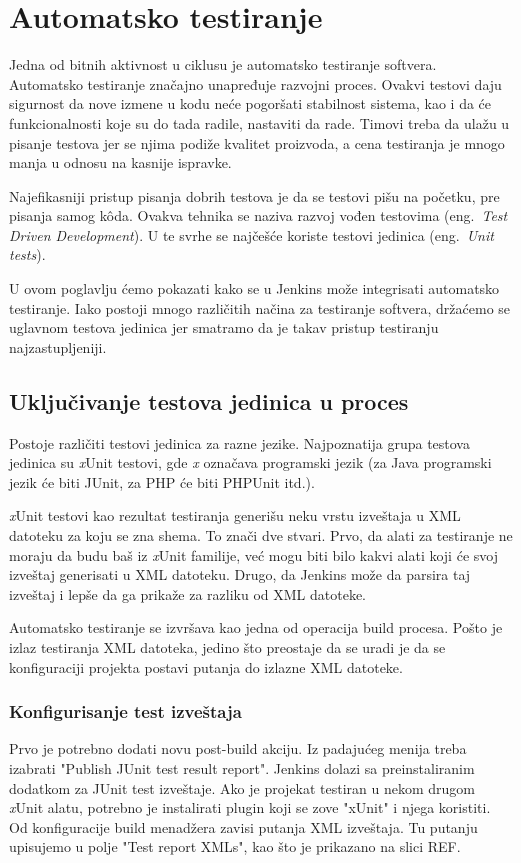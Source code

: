 \section{Automatsko testiranje}
Jedna od bitnih aktivnost u ciklusu je automatsko testiranje softvera. Automatsko testiranje značajno unapređuje razvojni proces. Ovakvi testovi daju sigurnost da nove izmene u kodu neće pogoršati stabilnost sistema, kao i da će funkcionalnosti koje su do tada radile, nastaviti da rade. Timovi treba da ulažu u pisanje testova jer se njima podiže kvalitet proizvoda, a cena testiranja je mnogo manja u odnosu na kasnije ispravke.

Najefikasniji pristup pisanja dobrih testova je da se testovi pišu na početku, pre pisanja samog k\^oda. Ovakva tehnika se naziva razvoj vođen testovima (eng.~{\em Test Driven Development}). U te svrhe se najčešće koriste testovi jedinica (eng.~{\em Unit tests}). 

U ovom poglavlju ćemo pokazati kako se u Jenkins može integrisati automatsko testiranje. Iako postoji mnogo različitih načina za testiranje softvera, držaćemo se uglavnom testova jedinica jer smatramo da je takav pristup testiranju najzastupljeniji.

\subsection{Uključivanje testova jedinica u proces}
Postoje različiti testovi jedinica za razne jezike. Najpoznatija grupa testova jedinica su \textit{x}Unit testovi, gde \textit{x} označava programski jezik (za Java programski jezik će biti JUnit, za PHP će biti PHPUnit itd.). 

\textit{x}Unit testovi kao rezultat testiranja generišu neku vrstu izveštaja u XML datoteku za koju se zna shema. To znači dve stvari. Prvo, da alati za testiranje ne moraju da budu baš iz \textit{x}Unit familije, već mogu biti bilo kakvi alati koji će svoj izveštaj generisati u XML datoteku. Drugo, da Jenkins može da parsira taj izveštaj i lepše da ga prikaže za razliku od XML datoteke.

Automatsko testiranje se izvršava kao jedna od operacija build procesa. Pošto je izlaz testiranja XML datoteka, jedino što preostaje da se uradi je da se konfiguraciji projekta postavi putanja do izlazne XML datoteke.

\subsubsection{Konfigurisanje test izveštaja}
Prvo je potrebno dodati novu post-build akciju. Iz padajućeg menija treba izabrati "Publish JUnit test result report". Jenkins dolazi sa preinstaliranim dodatkom za JUnit test izveštaje. Ako je projekat testiran u nekom drugom \textit{x}Unit alatu, potrebno je instalirati plugin koji se zove "xUnit" i njega koristiti. Od konfiguracije build menadžera zavisi putanja XML izveštaja. Tu putanju upisujemo u polje "Test report XMLs", kao što je prikazano na slici REF. 

